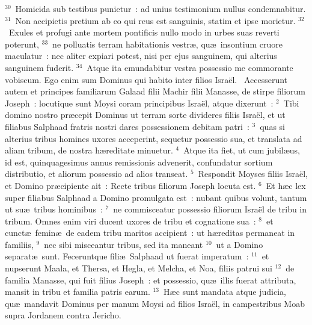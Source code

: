 ${}^{30}$~Homicida sub testibus punietur~: ad unius testimonium nullus condemnabitur.
${}^{31}$~Non accipietis pretium ab eo qui reus est sanguinis, statim et ipse morietur.
${}^{32}$~Exules et profugi ante mortem pontificis nullo modo in urbes suas reverti poterunt,
${}^{33}$~ne polluatis terram habitationis vestr\ae , qu\ae\ insontium cruore maculatur~: nec aliter expiari potest, nisi per ejus sanguinem, qui alterius sanguinem fuderit.
${}^{34}$~Atque ita emundabitur vestra possessio me commorante vobiscum. Ego enim sum Dominus qui habito inter filios Isra\"el.
~\lettrine[lines=10,image=true,loversize=0.05,lraise=-0.03]{A}{}ccesserunt autem et principes familiarum Galaad filii Machir filii Manasse, de stirpe filiorum Joseph~: locutique sunt Moysi coram principibus Isra\"el, atque dixerunt~:
${}^{2}$~Tibi domino nostro pr\ae cepit Dominus ut terram sorte divideres filiis Isra\"el, et ut filiabus Salphaad fratris nostri dares possessionem debitam patri~:
${}^{3}$~quas si alterius tribus homines uxores acceperint, sequetur possessio sua, et translata ad aliam tribum, de nostra h\ae reditate minuetur.
${}^{4}$~Atque ita fiet, ut cum jubil\ae us, id est, quinquagesimus annus remissionis advenerit, confundatur sortium distributio, et aliorum possessio ad alios transeat.
${}^{5}$~Respondit Moyses filiis Isra\"el, et Domino pr\ae cipiente ait~: Recte tribus filiorum Joseph locuta est.
${}^{6}$~Et h\ae c lex super filiabus Salphaad a Domino promulgata est~: nubant quibus volunt, tantum ut su\ae\ tribus hominibus~:
${}^{7}$~ne commisceatur possessio filiorum Isra\"el de tribu in tribum. Omnes enim viri ducent uxores de tribu et cognatione sua~:
${}^{8}$~et cunct\ae\ femin\ae\ de eadem tribu maritos accipient~: ut h\ae reditas permaneat in familiis,
${}^{9}$~nec sibi misceantur tribus, sed ita maneant
${}^{10}$~ut a Domino separat\ae\ sunt. Feceruntque fili\ae\ Salphaad ut fuerat imperatum~:
${}^{11}$~et nupserunt Maala, et Thersa, et Hegla, et Melcha, et Noa, filiis patrui sui
${}^{12}$~de familia Manasse, qui fuit filius Joseph~: et possessio, qu\ae\ illis fuerat attributa, mansit in tribu et familia patris earum.
${}^{13}$~H\ae c sunt mandata atque judicia, qu\ae\ mandavit Dominus per manum Moysi ad filios Isra\"el, in campestribus Moab supra Jordanem contra Jericho.
